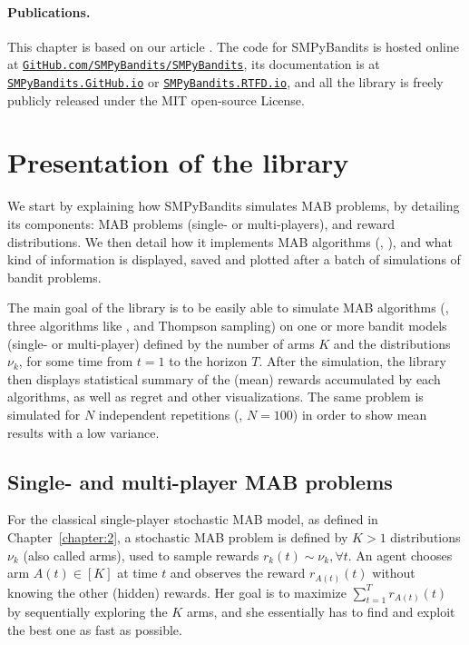 \paragraph{Publications.}
%
This chapter is based on our article \cite{SMPyBanditsJMLR}.
The code for SMPyBandits is hosted online at \texttt{\href{https://GitHub.com/SMPyBandits/SMPyBandits/}{GitHub.com/SMPyBandits/SMPyBandits}}, its documentation is at \texttt{\href{https://SMPyBandits.GitHub.io/}{SMPyBandits.GitHub.io}} or \texttt{\href{https://SMPyBandits.RTFD.io/}{SMPyBandits.RTFD.io}}, and all the library is freely publicly released under the MIT open-source License.


\section{Presentation of the library}
\label{sec:3:presentationLibrary}


We start by explaining how SMPyBandits simulates MAB problems, by detailing its components:
MAB problems (single- or multi-players),
and reward distributions.
%
We then detail how it implements MAB algorithms (\eg, \UCB),
and what kind of information is displayed, saved and plotted after a batch of simulations of bandit problems.

The main goal of the library is to be easily able to simulate MAB algorithms (\eg, three algorithms like \UCB, \klUCB{} and Thompson sampling) on one or more bandit models (single- or multi-player) defined by the number of arms $K$ and the distributions $\nu_k$, for some time from $t=1$ to the horizon $T$.
After the simulation, the library then displays statistical summary of the (mean) rewards accumulated by each algorithms, as well as regret and other visualizations.
The same problem is simulated for $N$ independent repetitions (\eg, $N=100$) in order to show mean results with a low variance.


\subsection{Single- and multi-player MAB problems}

For the classical single-player stochastic MAB model, as defined in Chapter~\ref{chapter:2},
a stochastic MAB problem is defined by $K>1$ distributions $\nu_k$ (also called arms),
used to sample \iid{} rewards $r_k(t) \sim \nu_k, \forall t$.
An agent chooses arm $A(t)\in[K]$ at time $t$ and observes the reward $r_{A(t)}(t)$ without knowing the other (hidden) rewards.
Her goal is to maximize $\sum_{t=1}^T r_{A(t)}(t)$ by sequentially exploring the $K$ arms, and she essentially has to find and exploit the best one as fast as possible.

